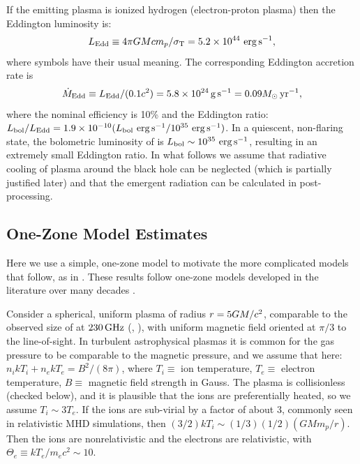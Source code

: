 If the emitting plasma is ionized hydrogen (electron-proton plasma) then the Eddington luminosity is:
\begin{equation}
L_\mathrm{Edd} \equiv 4\pi G\mbh c m_p/\sigma_\mathrm{T} = 5.2 \times 10^{44}\ergps,
\end{equation}
where symbols have their usual meaning.
The corresponding Eddington accretion rate is
\begin{equation}
\dot\mbh_\mathrm{Edd} \equiv L_\mathrm{Edd}/(0.1 c^2) = 5.8 \times 10^{24} \gm \sec^{-1} = 0.09 \msun \yr^{-1},
\end{equation}
where the nominal efficiency is 10\% and the Eddington ratio:
$L_\mathrm{bol}/L_\mathrm{Edd} = 1.9 \times 10^{-10} (L_\mathrm{bol} \,\,\mathrm{erg}\,\mathrm{s}^{-1} /10^{35} \,\,\mathrm{erg}\,\mathrm{s}^{-1})$.
In a quiescent, non-flaring state, the bolometric luminosity of \sgra is $L_\mathrm{bol} \sim 10^{35}\,\,\mathrm{erg}\,\mathrm{s}^{-1}$, resulting in an extremely small Eddington ratio.
In what follows we assume that radiative cooling of plasma around the black hole can be neglected (which is partially justified later) and that the emergent radiation can be calculated in post-processing.

\subsection{One-Zone Model Estimates}

Here we use a simple, one-zone model to motivate the more complicated models that follow, as in .  These results follow one-zone models developed in the literature over many decades \citep[e.g.][]{1996IAUS..169..169F}.

Consider a spherical, uniform plasma of radius $r = 5GM/c^2$, comparable to the observed size of \sgra at $230\,\mathrm{GHz}$ (, ), with uniform magnetic field oriented at $\pi/3$ to the line-of-sight.  In turbulent astrophysical plasmas it is common for  the gas pressure to be comparable to the magnetic pressure, and we assume that here: $n_i k T_i + n_e k T_e = B^2/(8\pi)$, where $T_i \equiv$ ion temperature, $T_e \equiv$ electron temperature, $B \equiv$ magnetic field strength in Gauss.  The plasma is collisionless (checked below), and it is plausible that the ions are preferentially heated, so we assume $T_i \sim 3 T_e$.  If the ions are sub-virial by a factor of about $3$, commonly seen in relativistic MHD simulations, then $(3/2) k T_i \sim (1/3) (1/2) (G M m_p/r)$.  Then the ions are nonrelativistic and the electrons are relativistic, with $\Theta_e \equiv  k T_e / m_e c^2 \sim 10$.

